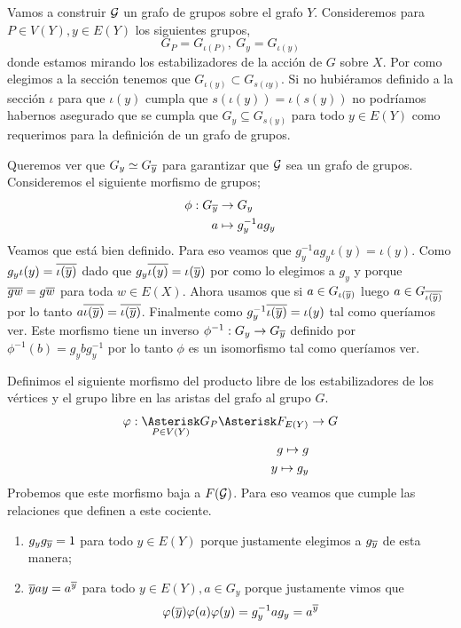 \documentclass[tesis.tex]{subfiles}
\begin{document}
\bigskip
Vamos a construir ${\cal G}$ un grafo de grupos sobre el grafo $Y$.
Consideremos para $P \in V(Y), y \in E(Y)$ los siguientes grupos,
\[
	G_P = G_{\iota (P)}, \ G_y = G_{\iota(y)}
\]
donde estamos mirando los estabilizadores de la acción de $G$ sobre $X$.
Por como elegimos a la sección tenemos que $G_{\iota(y)} \subset G_{s(\iota y)}$.
Si no hubiéramos definido a la sección $\iota$ para que $\iota(y)$ cumpla que $s(\iota (y)) = \iota(s(y))$ no podríamos habernos asegurado que se cumpla que $G_{y} \subseteq G_{s(y)}$ para todo $y \in E(Y)$ como requerimos para la definición de un grafo de grupos.

Queremos ver que $G_{y} \simeq G_{\overline y}$ para garantizar que ${\cal G}$ sea un grafo de grupos.
Consideremos el siguiente morfismo de grupos;
\begin{align*}
	\phi: G_{\overline y} &\to G_{y} \\
	a &\mapsto g_{y}^{-1}ag_{y}
\end{align*}
Veamos que está bien definido. 
Para eso veamos que $g_{y}^{-1}ag_{y} \iota(y) = \iota(y)$.
Como $g_y \iota(y) = \overline{\iota(\overline y)}$ dado que $g_y \overline{\iota(y)} = \iota (\overline y)$ por como lo elegimos a $g_y$ y porque $\overline{gw} = g \overline w$ para toda $w \in E(X)$.
Ahora usamos que si $a \in G_{\iota({\overline y})}$ luego $a \in G_{\overline{\iota(\overline y)}}$ por lo tanto $a \overline{\iota(\overline y)} = \overline{\iota(\overline y)} $.
Finalmente como $ g_{y}^{-1} \overline {\iota (\overline y) } = \iota (y)$ tal como queríamos ver.
Este morfismo tiene un inverso $\phi^{-1}: G_{y} \to G_{\overline y}$ definido por $\phi^{-1}(b) = g_{y}bg_{y}^{-1}$ por lo tanto $\phi$ es un isomorfismo tal como queríamos ver.




Definimos el siguiente morfismo del producto libre de los estabilizadores de los vértices y el grupo libre en las aristas del grafo al grupo $G$.
\begin{align*}
	\varphi: \underset{P \in V(Y)}{\Asterisk} G_P \Asterisk F_{E(Y)} &\to G	\\
	g \mapsto g \\
	y \mapsto g_y \\
\end{align*}
Probemos que este morfismo baja a $F({\cal G})$. 
Para eso veamos que cumple las relaciones que definen a este cociente.
\begin{enumerate}
	\item $g_y g_{\overline y} = 1$ para todo $y \in E(Y)$ porque justamente elegimos a $g_{\overline y}$ de esta manera;
	\item $\overline y a y = a^{\overline y}$ para todo $y \in E(Y), a \in G_y$ porque justamente vimos que 
	\[
		\varphi(\overline y) \varphi (a) \varphi(y) = g_y^{-1}ag_y = a^{\overline y}
	\]
\end{enumerate}
\end{document}
